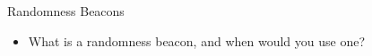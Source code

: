 \begin{frame}{Randomness Beacons}
    \begin{itemize}
        \item What is a randomness beacon, and when would you use one?
    \end{itemize}
\end{frame}
